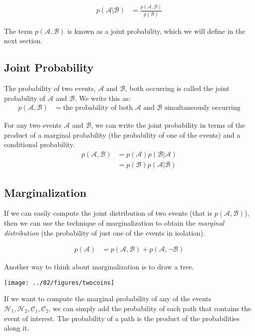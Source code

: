 \documentclass{tufte-handout}
\begin{document}
\begin{align}
p(\mathcal{A}|\mathcal{B}) &= \frac{p(\mathcal{A}, \mathcal{B})}{p(\mathcal{B})}
\end{align}

The term $p(\mathcal{A}, \mathcal{B})$ is known as a joint probability, which we will define in the next section.

\subsection{Joint Probability}
The probability of two events, $\mathcal{A}$ and $\mathcal{B}$, both occurring is called the joint probability of $\mathcal{A}$ and $\mathcal{B}$.  We write this as:
\begin{align}
p(\mathcal{A}, \mathcal{B}) &= \mbox{the probability of both $\mathcal{A}$ and $\mathcal{B}$ simultaneously occurring}
\end{align}

For any two events $\mathcal{A}$ and $\mathcal{B}$, we can write the joint probability in terms of the product of a marginal probability (the probability of one of the events) and a conditional probability.
\begin{align}
p(\mathcal{A}, \mathcal{B}) &= p(\mathcal{A}) p( \mathcal{B} | \mathcal{A})  \\
&= p(\mathcal{B}) p( \mathcal{A} | \mathcal{B})
\end{align}


\subsection{Marginalization}
If we can easily compute the joint distribution of two events (that is $p(\mathcal{A}, \mathcal{B})$), then we can use the technique of marginalization to obtain the \emph{marginal distribution} (the probability of just one of the events in isolation).

\begin{align}
p(\mathcal{A}) &= p(\mathcal{A}, \mathcal{B}) + p(\mathcal{A}, \neg \mathcal{B})
\end{align}


Another way to think about marginalization is to draw a tree.

\begin{center}
\texttt{[image: ../02/figures/twocoins]}
\end{center}

If we want to compute the marginal probability of any of the events $\mathcal{H}_1, \mathcal{H}_2, \mathcal{C}_1, \mathcal{C}_2$, we can simply add the probability of each path that contains the event of interest.  The probability of a path is the product of the probabilities along it.
\end{document}

